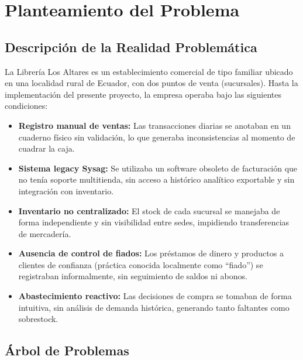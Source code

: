 \documentclass[12pt,a4paper,oneside]{report}
\begin{document}
\chapter{Planteamiento del Problema}

\section{Descripción de la Realidad Problemática}

La Librería Los Altares es un establecimiento comercial de tipo familiar ubicado en una localidad rural de Ecuador, con dos puntos de venta (sucursales). Hasta la implementación del presente proyecto, la empresa operaba bajo las siguientes condiciones:

\begin{itemize}[leftmargin=1.5cm]
  \item \textbf{Registro manual de ventas:} Las transacciones diarias se anotaban en un cuaderno físico sin validación, lo que generaba inconsistencias al momento de cuadrar la caja.
  \item \textbf{Sistema legacy Sysag:} Se utilizaba un software obsoleto de facturación que no tenía soporte multitienda, sin acceso a histórico analítico exportable y sin integración con inventario.
  \item \textbf{Inventario no centralizado:} El stock de cada sucursal se manejaba de forma independiente y sin visibilidad entre sedes, impidiendo transferencias de mercadería.
  \item \textbf{Ausencia de control de fiados:} Los préstamos de dinero y productos a clientes de confianza (práctica conocida localmente como ``fiado'') se registraban informalmente, sin seguimiento de saldos ni abonos.
  \item \textbf{Abastecimiento reactivo:} Las decisiones de compra se tomaban de forma intuitiva, sin análisis de demanda histórica, generando tanto faltantes como sobrestock.
\end{itemize}

\section{Árbol de Problemas}
\end{document}
